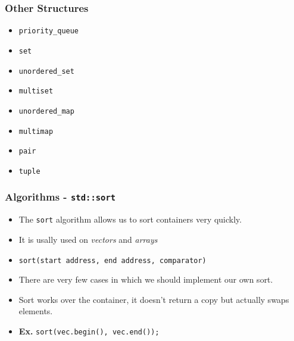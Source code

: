 \documentclass{beamer}
\begin{document}
\begin{frame}
    \frametitle{Other Structures}

    \begin{itemize}
        \item \texttt{priority\_queue}
        \item \texttt{set}
        \item \texttt{unordered\_set}
        \item \texttt{multiset}
        \item \texttt{unordered\_map}
        \item \texttt{multimap}
        \item \texttt{pair}
        \item \texttt{tuple}
    \end{itemize}
\end{frame}

\begin{frame}
    \frametitle{Algorithms - \texttt{std::sort}}

    \begin{itemize}
        \item The \texttt{sort} algorithm allows us to sort containers very quickly.
        \item It is usally used on \textit{vectors} and \textit{arrays}
        \item \texttt{sort(start address, end address, comparator)}
        \item There are very few cases in which we should implement our own sort.
        \item Sort works over the container, it doesn't return a copy but actually swaps elements.
        \item \textbf{Ex.}  \texttt{sort(vec.begin(), vec.end());}
    \end{itemize}
\end{frame}
\end{document}
